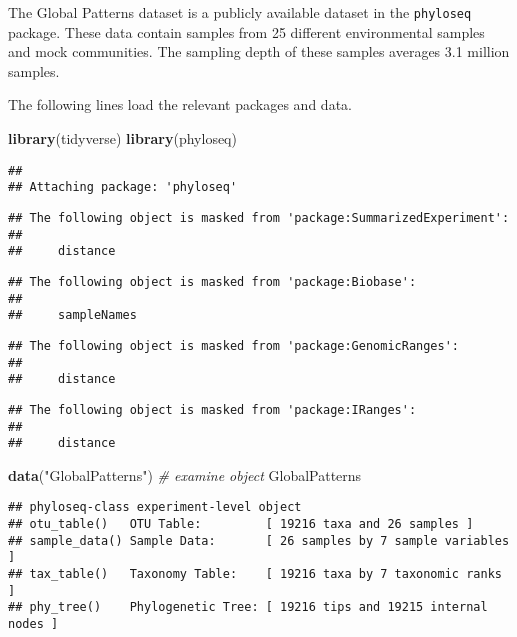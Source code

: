 \documentclass[
]{book}
\newenvironment{Shaded}{\begin{snugshade}}{\end{snugshade}}
\newcommand{\CommentTok}[1]{\textcolor[rgb]{0.56,0.35,0.01}{\textit{#1}}}
\newcommand{\KeywordTok}[1]{\textcolor[rgb]{0.13,0.29,0.53}{\textbf{#1}}}
\newcommand{\NormalTok}[1]{#1}
\newcommand{\StringTok}[1]{\textcolor[rgb]{0.31,0.60,0.02}{#1}}
\begin{document}
The Global Patterns dataset is a publicly available dataset in the \texttt{phyloseq} package. These data contain samples from 25 different environmental samples and mock communities. The sampling depth of these samples averages 3.1 million samples.

The following lines load the relevant packages and data.

\begin{Shaded}
\begin{Highlighting}[]
\KeywordTok{library}\NormalTok{(tidyverse)}
\KeywordTok{library}\NormalTok{(phyloseq)}
\end{Highlighting}
\end{Shaded}

\begin{verbatim}
## 
## Attaching package: 'phyloseq'
\end{verbatim}

\begin{verbatim}
## The following object is masked from 'package:SummarizedExperiment':
## 
##     distance
\end{verbatim}

\begin{verbatim}
## The following object is masked from 'package:Biobase':
## 
##     sampleNames
\end{verbatim}

\begin{verbatim}
## The following object is masked from 'package:GenomicRanges':
## 
##     distance
\end{verbatim}

\begin{verbatim}
## The following object is masked from 'package:IRanges':
## 
##     distance
\end{verbatim}

\begin{Shaded}
\begin{Highlighting}[]
\KeywordTok{data}\NormalTok{(}\StringTok{"GlobalPatterns"}\NormalTok{)}
\CommentTok{\# examine object }
\NormalTok{GlobalPatterns}
\end{Highlighting}
\end{Shaded}

\begin{verbatim}
## phyloseq-class experiment-level object
## otu_table()   OTU Table:         [ 19216 taxa and 26 samples ]
## sample_data() Sample Data:       [ 26 samples by 7 sample variables ]
## tax_table()   Taxonomy Table:    [ 19216 taxa by 7 taxonomic ranks ]
## phy_tree()    Phylogenetic Tree: [ 19216 tips and 19215 internal nodes ]
\end{verbatim}
\end{document}

